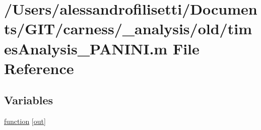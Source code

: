 \hypertarget{a00038}{\section{/\+Users/alessandrofilisetti/\+Documents/\+G\+I\+T/carness/\+\_\+analysis/old/times\+Analysis\+\_\+\+P\+A\+N\+I\+N\+I.m File Reference}
\label{a00038}
}
\subsection*{Variables}
\begin{DoxyCompactItemize}
\item 
\hyperlink{a00038_a370f3dd25136a73d619eba0aa2e3bb4b}{function} \mbox{[}\hyperlink{a00028_a34c820385e9209f49c18739329ad9206}{out}\mbox{]}
\end{DoxyCompactItemize}


